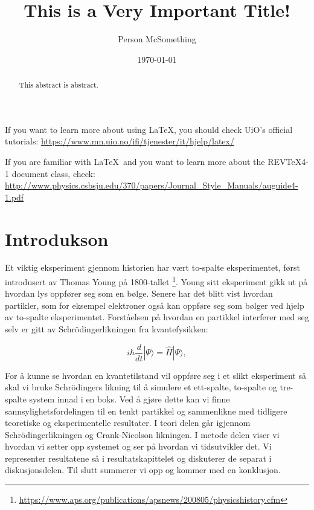 \documentclass[reprint,english,notitlepage]{revtex4-2}  %
\begin{document}
\title{This is a Very Important Title!}   %
\author{Person McSomething}               %
\date{\today}                             %
\noaffiliation                            %
\begin{abstract}                          %
This abstract is abstract.                %
\end{abstract}                            %
\maketitle                                %

If you want to learn more about using \LaTeX, you should check UiO's official tutorials:
\url{https://www.mn.uio.no/ifi/tjenester/it/hjelp/latex/}

If you are familiar with \LaTeX\ and you want to learn more about the REVTeX4-1 document class, check:
\url{http://www.physics.csbsju.edu/370/papers/Journal_Style_Manuals/auguide4-1.pdf}


\section{Introdukson}

Et viktig eksperiment gjennom historien har vært to-spalte eksperimentet, først introdusert av Thomas Young på 1800-tallet \footnote{\url{https://www.aps.org/publications/apsnews/200805/physicshistory.cfm}}. Young sitt eksperiment gikk ut på hvordan lys oppfører seg som en bølge. Senere har det blitt vist hvordan partikler, som for eksempel elektroner også kan oppføre seg som bølger ved hjelp av to-spalte eksperimentet. Forståelsen på hvordan en partikkel interferer med seg selv er gitt av Schrödingerlikningen fra kvantefysikken:

\begin{equation}
i \hbar \frac{d}{dt} |\Psi\rangle = \hat{H} |\Psi\rangle,
\end{equation}

For å kunne se hvordan en kvantetilstand vil oppføre seg i et slikt eksperiment så skal vi bruke Schrödingers likning til å simulere et ett-spalte, to-spalte og tre-spalte system innad i en boks. Ved å gjøre dette kan vi finne sannsylighetsfordelingen til en tenkt partikkel og sammenlikne med tidligere teoretiske og eksperimentelle resultater. I teori delen går igjennom Schrödingerlikningen og Crank-Nicolson likningen. I metode delen viser vi hvordan vi setter opp systemet og ser på hvordan vi tidsutvikler det. Vi representer resultatene så i resultatskapittelet og diskuterer de separat i diskusjonsdelen. Til slutt summerer vi opp og kommer med en konklusjon.
\end{document}
